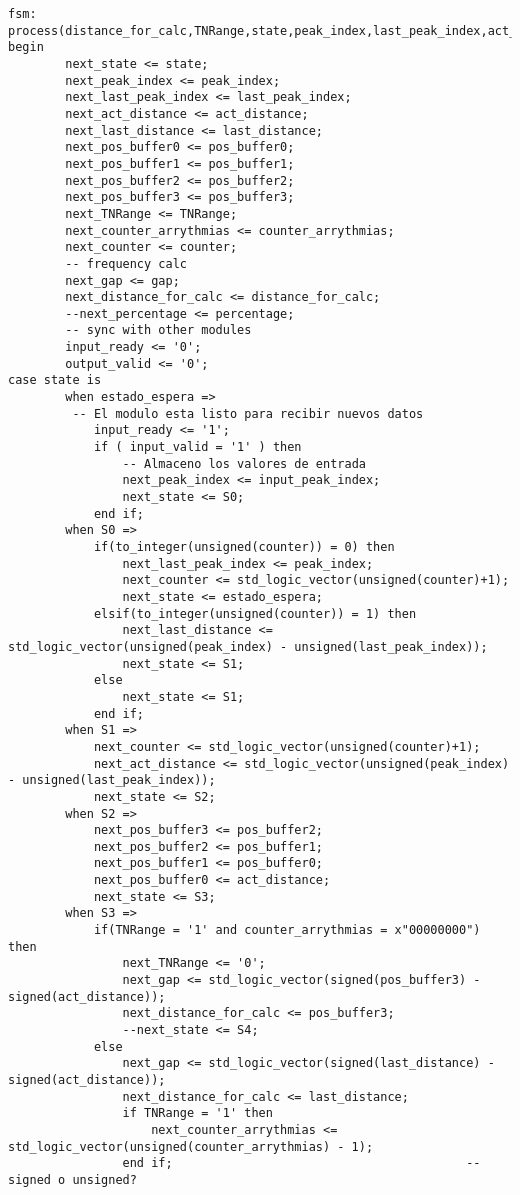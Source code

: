 \begin{lstlisting}[frame=single]
fsm: process(distance_for_calc,TNRange,state,peak_index,last_peak_index,act_distance,last_distance,pos_buffer0,pos_buffer1,pos_buffer2,pos_buffer3,counter_arrythmias,counter,gap,percentage,input_valid,input_peak_index,output_ready)
begin
        next_state <= state;
        next_peak_index <= peak_index;
        next_last_peak_index <= last_peak_index;
        next_act_distance <= act_distance;
        next_last_distance <= last_distance;
        next_pos_buffer0 <= pos_buffer0;
        next_pos_buffer1 <= pos_buffer1;
        next_pos_buffer2 <= pos_buffer2;
        next_pos_buffer3 <= pos_buffer3;
        next_TNRange <= TNRange;
        next_counter_arrythmias <= counter_arrythmias;
        next_counter <= counter; 
        -- frequency calc
        next_gap <= gap;
        next_distance_for_calc <= distance_for_calc;
        --next_percentage <= percentage;
        -- sync with other modules
        input_ready <= '0';
        output_valid <= '0';
case state is
        when estado_espera =>
         -- El modulo esta listo para recibir nuevos datos
            input_ready <= '1';
            if ( input_valid = '1' ) then
                -- Almaceno los valores de entrada
                next_peak_index <= input_peak_index;
                next_state <= S0;    
            end if;
        when S0 =>
            if(to_integer(unsigned(counter)) = 0) then
                next_last_peak_index <= peak_index;
                next_counter <= std_logic_vector(unsigned(counter)+1);
                next_state <= estado_espera; 
            elsif(to_integer(unsigned(counter)) = 1) then
                next_last_distance <= std_logic_vector(unsigned(peak_index) - unsigned(last_peak_index));
                next_state <= S1;
            else 
                next_state <= S1;
            end if;
        when S1 =>
            next_counter <= std_logic_vector(unsigned(counter)+1);
            next_act_distance <= std_logic_vector(unsigned(peak_index) - unsigned(last_peak_index));
            next_state <= S2;
        when S2 => 
            next_pos_buffer3 <= pos_buffer2;
            next_pos_buffer2 <= pos_buffer1;
            next_pos_buffer1 <= pos_buffer0;
            next_pos_buffer0 <= act_distance;
            next_state <= S3;
        when S3 => 
            if(TNRange = '1' and counter_arrythmias = x"00000000") then
                next_TNRange <= '0';
                next_gap <= std_logic_vector(signed(pos_buffer3) - signed(act_distance));
                next_distance_for_calc <= pos_buffer3;
                --next_state <= S4;
            else
                next_gap <= std_logic_vector(signed(last_distance) - signed(act_distance));
                next_distance_for_calc <= last_distance;
                if TNRange = '1' then
                    next_counter_arrythmias <= std_logic_vector(unsigned(counter_arrythmias) - 1);
                end if;                                         --signed o unsigned?


\end{lstlisting}
